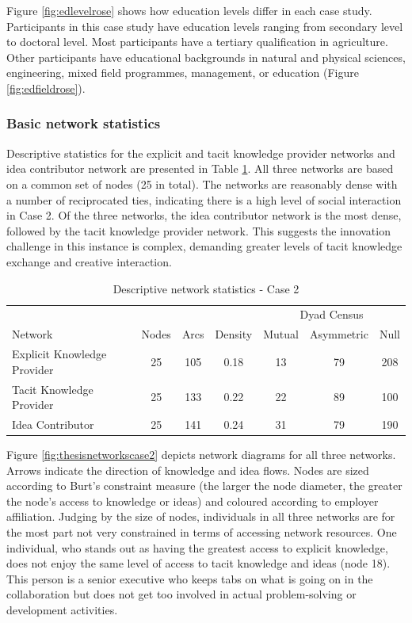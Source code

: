 Figure \ref{fig:edlevelrose} shows how education levels differ in each case study. Participants in this case study have education levels ranging from secondary level to doctoral level. Most participants have a tertiary qualification in agriculture. Other participants have educational backgrounds in natural and physical sciences, engineering, mixed field programmes, management, or education (Figure \ref{fig:edfieldrose}). 

\subsubsection{Basic network statistics}

Descriptive statistics for the explicit and tacit knowledge provider networks and idea contributor network are presented in Table \ref{ds_c2}. All three networks are based on a common set of nodes (25 in total). The networks are reasonably dense with a number of reciprocated ties, indicating there is a high level of social interaction in Case 2. Of the three networks, the idea contributor network is the most dense, followed by the tacit knowledge provider network. This suggests the innovation challenge in this instance is complex, demanding greater levels of tacit knowledge exchange and creative interaction.\medskip

\begin{table}[]
	\small
	\centering
	\caption{Descriptive network statistics - Case 2}
	\label{ds_c2}
	\begin{tabular}{@{}lcccccc@{}}
		\toprule
		& \multicolumn{1}{l}{} & \multicolumn{1}{l}{} & \multicolumn{1}{l}{} & \multicolumn{3}{c}{Dyad Census}	\\ \cline{5-7}
		Network						& Nodes			& Arcs			& Density	& Mutual		& Asymmetric	& Null		\\ \midrule
		Explicit Knowledge Provider & 25			& 105			& 0.18		& 13			& 79			& 208		\\
		Tacit Knowledge Provider    & 25			& 133			& 0.22		& 22			& 89			& 100		\\
		Idea Contributor            & 25			& 141			& 0.24		& 31			& 79			& 190		\\ \bottomrule
	\end{tabular}
\end{table}

Figure \ref{fig:thesisnetworkscase2} depicts network diagrams for all three networks. Arrows indicate the direction of knowledge and idea flows. Nodes are sized according to Burt's constraint measure (the larger the node diameter, the greater the node's access to knowledge or ideas) and coloured according to employer affiliation. Judging by the size of nodes, individuals in all three networks are for the most part not very constrained in terms of accessing network resources. One individual, who stands out as having the greatest access to explicit knowledge, does not enjoy the same level of access to tacit knowledge and ideas (node 18). This person is a senior executive who keeps tabs on what is going on in the collaboration but does not get too involved in actual problem-solving or development activities.\medskip 

